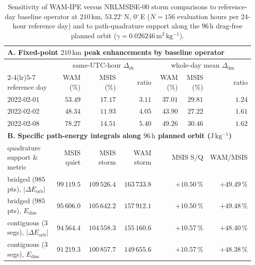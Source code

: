 \documentclass[12pt]{article}
\newcommand{\unit}[1]{\,\mathrm{#1}}
\newcommand{\degree}{\ensuremath{{}^\circ}}
\begin{document}
\begin{table}[htbp]
\centering
\footnotesize
\setlength{\tabcolsep}{4.5pt}
\caption{Sensitivity of WAM-IPE versus NRLMSISE-00 storm comparisons to reference-day baseline operator at $210\unit{km}$, $53.22\degree$\,N, $0\degree$\,E ($N=156$ evaluation hours per 24-hour reference day) and to path-quadrature support along the $96\unit{h}$ drag-free planned orbit ($\gamma = 0.026246\unit{m^2\,kg^{-1}}$).}
\label{tab:wam-operators}
\begin{tabular}{lrrrrrr}
\toprule
\multicolumn{7}{l}{\textbf{A. Fixed-point $210\unit{km}$ peak enhancements by baseline operator}} \\
\midrule
 & \multicolumn{3}{c}{same-UTC-hour $\Delta_{\mathrm{sh}}$} & \multicolumn{3}{c}{whole-day mean $\Delta_{\mathrm{dm}}$} \\
\cmidrule(lr){2-4}\cmidrule(lr){5-7}
reference day & WAM (\%) & MSIS (\%) & ratio & WAM (\%) & MSIS (\%) & ratio \\
\midrule
2022-02-01 & $53.49$ & $17.17$ & $3.11$ & $37.01$ & $29.81$ & $1.24$ \\
2022-02-02 & $48.34$ & $11.93$ & $4.05$ & $43.90$ & $27.22$ & $1.61$ \\
2022-02-08 & $78.27$ & $14.51$ & $5.40$ & $49.26$ & $30.46$ & $1.62$ \\
\midrule
\multicolumn{7}{l}{\textbf{B. Specific path-energy integrals along $96\unit{h}$ planned orbit ($\mathrm{J\,kg^{-1}}$)}} \\
\midrule
quadrature support \& metric & MSIS quiet & MSIS storm & WAM storm & \multicolumn{2}{r}{MSIS S/Q} & WAM/MSIS \\
\midrule
bridged ($985$ pts), $|\Delta E_{\mathrm{orb}}|$ & $99\,119.5$ & $109\,526.4$ & $163\,733.8$ & \multicolumn{2}{r}{$+10.50\,\%$} & $+49.49\,\%$ \\
bridged ($985$ pts), $E_{\mathrm{diss}}$ & $95\,606.0$ & $105\,642.2$ & $157\,912.1$ & \multicolumn{2}{r}{$+10.50\,\%$} & $+49.48\,\%$ \\
contiguous (3 segs), $|\Delta E_{\mathrm{orb}}|$ & $94\,564.4$ & $104\,558.3$ & $155\,160.6$ & \multicolumn{2}{r}{$+10.57\,\%$} & $+48.40\,\%$ \\
contiguous (3 segs), $E_{\mathrm{diss}}$ & $91\,219.3$ & $100\,857.7$ & $149\,655.6$ & \multicolumn{2}{r}{$+10.57\,\%$} & $+48.38\,\%$ \\
\bottomrule
\end{tabular}
\end{table}
\end{document}
